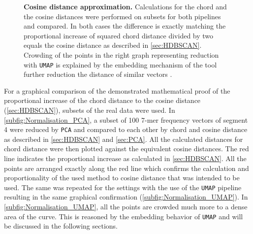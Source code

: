 \begin{figure}[!hbt]
\begin{subfigure}[b]{0.475\textwidth}
    \end{subfigure}
    \caption[Cosine distance approximation]{\textbf{Cosine distance approximation.} Calculations for the chord and the cosine distances were performed on subsets for both pipelines and compared. In both cases the difference is exactly matching the proportional increase of squared chord distance divided by two equals the cosine distance as described in \autoref{sec:HDBSCAN}. Crowding of the points in the right graph representing reduction with \texttt{UMAP} is explained by the embedding mechanism of the tool further reduction the distance of similar vectors \autocite{mcinnes_umap_2020}.}
    \label{fig:Normalisation_Methods}
\end{figure}

For a graphical comparison of the demonstrated mathematical proof of the proportional increase of the chord distance to the cosine distance (\autoref{sec:HDBSCAN}), subsets of the real data were used. In \autoref{subfig:Normalisation_PCA}, a subset of 100 7-mer frequency vectors of segment 4 were reduced by \texttt{PCA} and compared to each other by chord and cosine distance as described in \autoref{sec:HDBSCAN} and \autoref{sec:PCA}. All the calculated distances for chord distance were then plotted against the equivalent cosine distances. The red line indicates the proportional increase as calculated in \autoref{sec:HDBSCAN}. All the points are arranged exactly along the red line which confirms the calculation and proportionality of the used method to cosine distance that was intended to be used. The same was repeated for the settings with the use of the \texttt{UMAP} pipeline resulting in the same graphical confirmation (\autoref{subfig:Normalisation_UMAP}). In \autoref{subfig:Normalisation_UMAP}, all the points are crowded much more to a dense area of the curve. This is reasoned by the embedding behavior of \texttt{UMAP} and will be discussed in the following sections.











